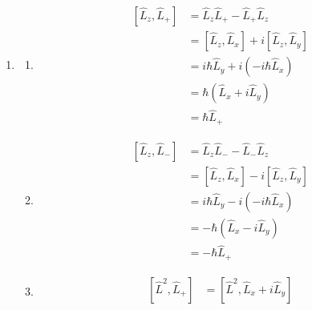 \documentclass[fleqn, a4paper, 11pt, oneside]{amsart}
\theoremstyle{definition}
\theoremstyle{theorem}
\begin{document}
\begin{solution}
	\begin{enumerate}[leftmargin=*]
		\item
			\begin{enumerate}[leftmargin=*]
				\item
					\begin{align*}
						\left[ \hat{L}_z,\hat{L}_+ \right] & = \hat{L}_z \hat{L}_+ - \hat{L}_+ \hat{L}_z                                 \\
                                                                                   & = \left[ \hat{L}_z,\hat{L}_x \right] + i \left[ \hat{L}_z,\hat{L}_y \right] \\
                                                                                   & = i \hbar \hat{L}_y + i \left( -i \hbar \hat{L}_x \right)                   \\
                                                                                   & = \hbar \left( \hat{L}_x + i \hat{L}_y \right)                              \\
                                                                                   & = \hbar \hat{L}_+
					\end{align*}
				\item
					\begin{align*}
						\left[ \hat{L}_z,\hat{L}_- \right] & = \hat{L}_z \hat{L}_- - \hat{L}_- \hat{L}_z                                 \\
                                                                                   & = \left[ \hat{L}_z,\hat{L}_x \right] - i \left[ \hat{L}_z,\hat{L}_y \right] \\
                                                                                   & = i \hbar \hat{L}_y - i \left( -i \hbar \hat{L}_x \right)                   \\
                                                                                   & = -\hbar \left( \hat{L}_x - i \hat{L}_y \right)                             \\
                                                                                   & = -\hbar \hat{L}_+
					\end{align*}
				\item
					\begin{align*}
						\left[ \hat{L}^2,\hat{L}_+ \right] & = \left[ \hat{L}^2,\hat{L}_x + i \hat{L}_y \right]                          \\

\end{align*}
\end{enumerate}
\end{enumerate}
\end{solution}
\end{document}
